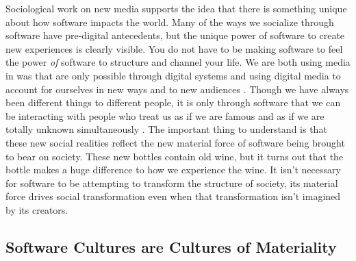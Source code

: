 \documentclass[a4paper,man,natbib,floatsintext]{apa6}
\begin{document}
  Sociological work on new media supports the idea that there is something unique about how software impacts the world. Many of the ways we socialize through software have pre-digital antecedents, but the unique power of software to create new experiences is clearly visible. You do not have to be making software to feel the power \textit{of} software to structure and channel your life. We are both using media in was that are only possible through digital systems and using digital media to account for ourselves in new ways and to new audiences \citep{Humphreys2018-ge,Jurgenson2019-tl}. Though we have always been different things to different people, it is only through software that we can be interacting with people who treat us as if we are famous and as if we are totally unknown simultaneously \citep{Dean2010-lk}. The important thing to understand is that these new social realities reflect the new material force of software being brought to bear on society. These new bottles contain old wine, but it turns out that the bottle makes a huge difference to how we experience the wine. It isn't necessary for software to be attempting to transform the structure of society, its material force drives social transformation even when that transformation isn't imagined by its creators. 


  \subsection*{Software Cultures are Cultures of Materiality}
\end{document}
